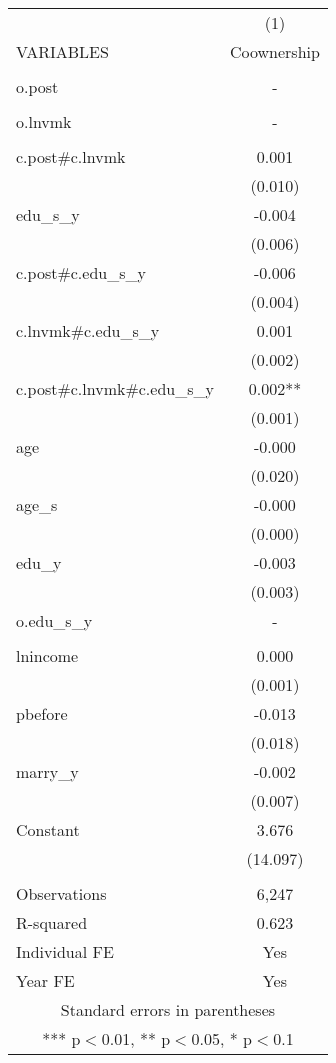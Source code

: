 \begin{tabular}{lc} \hline
 & (1) \\
VARIABLES & Coownership \\ \hline
 &  \\
o.post & - \\
 &  \\
o.lnvmk & - \\
 &  \\
c.post\#c.lnvmk & 0.001 \\
 & (0.010) \\
edu\_s\_y & -0.004 \\
 & (0.006) \\
c.post\#c.edu\_s\_y & -0.006 \\
 & (0.004) \\
c.lnvmk\#c.edu\_s\_y & 0.001 \\
 & (0.002) \\
c.post\#c.lnvmk\#c.edu\_s\_y & 0.002** \\
 & (0.001) \\
age & -0.000 \\
 & (0.020) \\
age\_s & -0.000 \\
 & (0.000) \\
edu\_y & -0.003 \\
 & (0.003) \\
o.edu\_s\_y & - \\
 &  \\
lnincome & 0.000 \\
 & (0.001) \\
pbefore & -0.013 \\
 & (0.018) \\
marry\_y & -0.002 \\
 & (0.007) \\
Constant & 3.676 \\
 & (14.097) \\
 &  \\
Observations & 6,247 \\
R-squared & 0.623 \\
Individual FE & Yes \\
 Year FE & Yes \\ \hline
\multicolumn{2}{c}{ Standard errors in parentheses} \\
\multicolumn{2}{c}{ *** p$<$0.01, ** p$<$0.05, * p$<$0.1} \\
\end{tabular}
